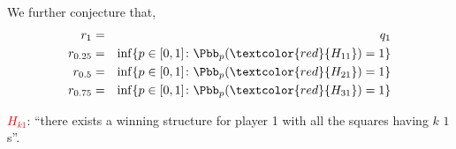 \documentclass[11pt, mathserif]{beamer}
\begin{document}
    \begin{frame}
        We further conjecture that, 
        \begin{eqnarray*}
              r_1 & = & q_1 \\
              r_{0.25} & = & \inf\{p \in [0, 1] \colon \Pbb_p(\textcolor{red}{H_{11}}) = 1\} \\
              r_{0.5}  & = & \inf\{p \in [0, 1] \colon \Pbb_p(\textcolor{red}{H_{21}}) = 1\} \\
              r_{0.75} & = & \inf\{p \in [0, 1] \colon \Pbb_p(\textcolor{red}{H_{31}}) = 1\}
        \end{eqnarray*}
        
        \textcolor{red}{$H_{k1}$}: ``there exists a winning structure for player 1 with all the squares having $k$ $1$s''.
        \vspace{0.2cm}


        \vspace{0.5cm}
    \end{frame}
\end{document}
